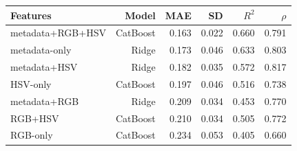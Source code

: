 \begin{tabular}{lrrrrr}
\toprule
Features & Model & MAE & SD &  $R^2$ & $\rho$ \\
\midrule
metadata+RGB+HSV & CatBoost & 0.163 & 0.022 & 0.660 & 0.791 \\
metadata-only & Ridge & 0.173 & 0.046 & 0.633 & 0.803 \\
metadata+HSV & Ridge & 0.182 & 0.035 & 0.572 & 0.817 \\
HSV-only & CatBoost & 0.197 & 0.046 & 0.516 & 0.738 \\
metadata+RGB & Ridge & 0.209 & 0.034 & 0.453 & 0.770 \\
RGB+HSV & CatBoost & 0.210 & 0.034 & 0.505 & 0.772 \\
RGB-only & CatBoost & 0.234 & 0.053 & 0.405 & 0.660 \\
\bottomrule
\end{tabular}

